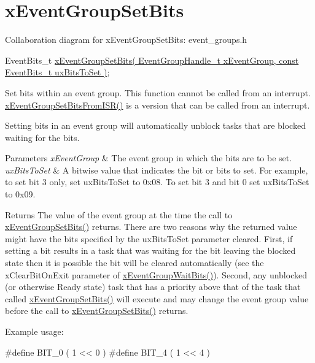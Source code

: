 \hypertarget{group__x_event_group_set_bits}{}\section{x\+Event\+Group\+Set\+Bits}
\label{group__x_event_group_set_bits}
Collaboration diagram for x\+Event\+Group\+Set\+Bits\+:
event\+\_\+groups.\+h 
\begin{DoxyPre}
   EventBits\_t \hyperlink{externals_2freertos_2include_2event__groups_8h_a02d7b3bb55f7e11d9c47116266c5fb2e}{xEventGroupSetBits( EventGroupHandle\_t xEventGroup, const EventBits\_t uxBitsToSet )};
  \end{DoxyPre}


Set bits within an event group. This function cannot be called from an interrupt. \hyperlink{vendor_2ceedling_2plugins_2freertos_2src_2freertos_2include_2event__groups_8h_a62b68278abac6358369ae8e390988a02}{x\+Event\+Group\+Set\+Bits\+From\+I\+S\+R()} is a version that can be called from an interrupt.

Setting bits in an event group will automatically unblock tasks that are blocked waiting for the bits.


\begin{DoxyParams}{Parameters}
{\em x\+Event\+Group} & The event group in which the bits are to be set.\\
\hline
{\em ux\+Bits\+To\+Set} & A bitwise value that indicates the bit or bits to set. For example, to set bit 3 only, set ux\+Bits\+To\+Set to 0x08. To set bit 3 and bit 0 set ux\+Bits\+To\+Set to 0x09.\\
\hline
\end{DoxyParams}
\begin{DoxyReturn}{Returns}
The value of the event group at the time the call to \hyperlink{externals_2freertos_2include_2event__groups_8h_a02d7b3bb55f7e11d9c47116266c5fb2e}{x\+Event\+Group\+Set\+Bits()} returns. There are two reasons why the returned value might have the bits specified by the ux\+Bits\+To\+Set parameter cleared. First, if setting a bit results in a task that was waiting for the bit leaving the blocked state then it is possible the bit will be cleared automatically (see the x\+Clear\+Bit\+On\+Exit parameter of \hyperlink{externals_2freertos_2include_2event__groups_8h_aab9d5b405bc57b7624dcabe9a9a503db}{x\+Event\+Group\+Wait\+Bits()}). Second, any unblocked (or otherwise Ready state) task that has a priority above that of the task that called \hyperlink{externals_2freertos_2include_2event__groups_8h_a02d7b3bb55f7e11d9c47116266c5fb2e}{x\+Event\+Group\+Set\+Bits()} will execute and may change the event group value before the call to \hyperlink{externals_2freertos_2include_2event__groups_8h_a02d7b3bb55f7e11d9c47116266c5fb2e}{x\+Event\+Group\+Set\+Bits()} returns.
\end{DoxyReturn}
Example usage\+: 
\begin{DoxyPre}
#define BIT\_0 ( 1 << 0 )
#define BIT\_4 ( 1 << 4 )\end{DoxyPre}



